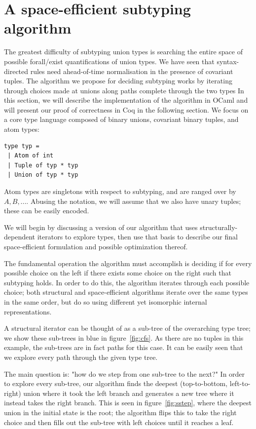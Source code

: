 \documentclass[a4paper,english]{lipics-v2019}
\begin{document}
\section{A space-efficient subtyping algorithm}

The greatest difficulty of subtyping union types is searching the entire
space of possible forall/exist quantifications of union types. We have seen
that syntax-directed rules need ahead-of-time normalisation in the presence
of covariant tuples.  The algorithm we propose for deciding subtyping works
by iterating through choices made at unions along paths complete through the
two types In this section, we will describe the implementation of the
algorithm in OCaml and will present our proof of correctness in Coq in the
following section.  We focus on a core type language composed of binary
unions, covariant binary tuples, and atom types:

\begin{lstlisting}
type typ =
 | Atom of int
 | Tuple of typ * typ
 | Union of typ * typ
\end{lstlisting}

Atom types are singletons with respect to subtyping, and are ranged
over by
\(A, B, ...\).  Abusing the
notation, we will assume that we also have unary
tuples; these can be easily encoded. 

We will begin by discussing a version of our algorithm that uses structurally-
dependent iterators to explore types, then use that basis to describe our
final space-efficient formulation and possible optimization thereof. 

The fundamental operation the algorithm must accomplish is deciding if
for every possible choice on the left if there exists some choice on the
right such that subtyping holds. In order to do this, the algorithm iterates
through each possible choice; both structural and space-efficient algorithms
iterate over the same types in the same order, but do so using different yet 
isomorphic internal representations.

A structural iterator can be thought of as a sub-tree of the overarching type
tree; we show these sub-trees in blue in figure~\ref{fig:cfs}. As there are no
tuples in this example, the sub-trees are in fact paths for this case. It can
be easily seen that we explore every path through the given type tree.

The main question is: "how do we step from one sub-tree to the next?" In order
to explore every sub-tree, our algorithm finds the deepest (top-to-bottom,
left-to-right) union where it took the left branch and generates a new tree
where it instead takes the right branch. This is seen in
figure~\ref{fig:sstep}, where the deepest union in the initial state is the
root; the algorithm flips this to take the right choice and then fills out the
sub-tree with left choices until it reaches a  leaf.
\end{document}
